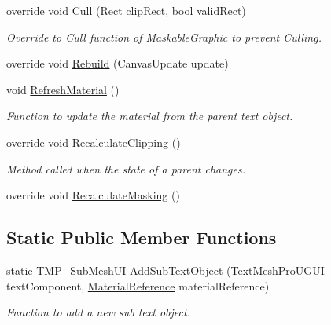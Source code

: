 \begin{DoxyCompactItemize}
\item 
override void \mbox{\hyperlink{class_t_m_pro_1_1_t_m_p___sub_mesh_u_i_ab4b2cf894e690a63576d8713a5729099}{Cull}} (Rect clip\+Rect, bool valid\+Rect)
\begin{DoxyCompactList}\small\item\em Override to Cull function of Maskable\+Graphic to prevent Culling. \end{DoxyCompactList}\item 
override void \mbox{\hyperlink{class_t_m_pro_1_1_t_m_p___sub_mesh_u_i_aa1918700dd7e78768075a88b31db98a2}{Rebuild}} (Canvas\+Update update)
\item 
void \mbox{\hyperlink{class_t_m_pro_1_1_t_m_p___sub_mesh_u_i_ac6bb1546f8b9fe175ba68e2d253935b5}{Refresh\+Material}} ()
\begin{DoxyCompactList}\small\item\em Function to update the material from the parent text object. \end{DoxyCompactList}\item 
override void \mbox{\hyperlink{class_t_m_pro_1_1_t_m_p___sub_mesh_u_i_a6505e4b6f7c11eeb4ea155d7d6ef4248}{Recalculate\+Clipping}} ()
\begin{DoxyCompactList}\small\item\em Method called when the state of a parent changes. \end{DoxyCompactList}\item 
override void \mbox{\hyperlink{class_t_m_pro_1_1_t_m_p___sub_mesh_u_i_a6f662a8acac8a908a79012344a8e2330}{Recalculate\+Masking}} ()
\end{DoxyCompactItemize}
\subsection*{Static Public Member Functions}
\begin{DoxyCompactItemize}
\item 
static \mbox{\hyperlink{class_t_m_pro_1_1_t_m_p___sub_mesh_u_i}{T\+M\+P\+\_\+\+Sub\+Mesh\+UI}} \mbox{\hyperlink{class_t_m_pro_1_1_t_m_p___sub_mesh_u_i_a72235ccd83b46453ebb152ff645602be}{Add\+Sub\+Text\+Object}} (\mbox{\hyperlink{class_t_m_pro_1_1_text_mesh_pro_u_g_u_i}{Text\+Mesh\+Pro\+U\+G\+UI}} text\+Component, \mbox{\hyperlink{struct_t_m_pro_1_1_material_reference}{Material\+Reference}} material\+Reference)
\begin{DoxyCompactList}\small\item\em Function to add a new sub text object. \end{DoxyCompactList}\end{DoxyCompactItemize}
